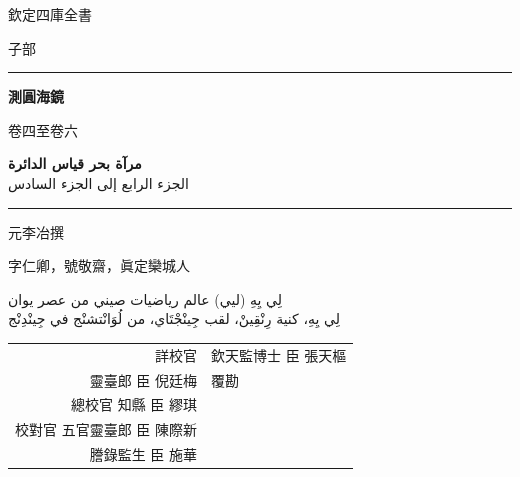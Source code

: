 \documentclass[11pt,a4paper]{article}
\begin{document}
\begin{titlepage}
\begin{center}
\vspace*{1.5cm}

{\fontsize{12}{16}\selectfont 欽定四庫全書}

\vspace{0.8cm}

{\fontsize{10}{14}\selectfont 子部}

\vspace{1.5cm}

\rule{0.85\textwidth}{1.5pt}

\vspace{0.8cm}

{\fontsize{26}{34}\selectfont\bfseries\color{titlecolor} 測圓海鏡}

\vspace{0.4cm}

{\fontsize{14}{20}\selectfont\color{notecolor} 卷四至卷六}

\vspace{0.6cm}

{\fontsize{18}{24}\selectfont\arabicfont\beginR\color{titlecolor}
\textbf{مرآة بحر قياس الدائرة}\\[0.3cm]
{\large الجزء الرابع إلى الجزء السادس}\endR}

\vspace{0.8cm}

\rule{0.85\textwidth}{1.5pt}

\vspace{1.5cm}

{\fontsize{12}{16}\selectfont 元\quad 李冶\quad 撰}

\vspace{0.3cm}

{\fontsize{10}{14}\selectfont\color{notecolor} 字仁卿，號敬齋，眞定欒城人}

\vspace{0.8cm}

{\fontsize{11}{15}\selectfont\arabicfont\beginR\color{notecolor}
لِي يِهِ (ليي) \textbullet{} عالم رياضيات صيني من عصر يوان\\
لِي يِهِ، كنية رِنْقِينْ، لقب جِينْجْتَاي، من لُوَانْتشنْج في جِينْدِنْج
\endR}

\vspace{1.5cm}

{\fontsize{10}{14}\selectfont\color{notecolor}
\begin{tabular}{rl}
詳校官 & 欽天監博士 臣 張天樞 \\
靈臺郎 臣 倪廷梅 & 覆勘 \\
總校官 知縣 臣 繆琪 & \\
校對官 五官靈臺郎 臣 陳際新 & \\
謄錄監生 臣 施華 & \\
\end{tabular}
}


\end{center}
\end{titlepage}
\end{document}
